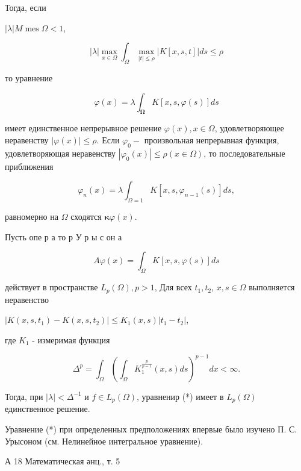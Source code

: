 \documentclass[10pt]{article}
\begin{document}
Тогда, если



$|\lambda| M \operatorname{mes} \Omega<1$,



\[

|\lambda| \max _{x \in \Omega} \int_{\Omega} \max _{|t| \leqslant \rho}|K[x, s, t]| d s \leqslant \rho

\]



то уравнение



\[

\varphi(x)=\lambda \int_{\mathbf{\Omega}} K[x, s, \varphi(s)] d s

\]



имеет единственное непрерывное решение $\varphi(x), x \in \Omega$, удовлетворяющее неравенству $|\varphi(x)| \leqslant \rho$. Если $\varphi_{0}-$ произвольная непрерывная функция, удовлетворяющая неравенству $\left|\varphi_{0}(x)\right| \leqslant \rho(x \in \Omega)$, то последовательные приближения



\[

\varphi_{n}(x)=\lambda \int_{\Omega=1} K\left[x, s, \varphi_{n-1}(s)\right] d s,

\]



равномерно на $\Omega$ сходятся $\mathbf{\kappa} \varphi(x)$.



Пусть опе р а то р У р ы с он а



\[

A \varphi(x)=\int_{\Omega} K[x, s, \varphi(s)] d s

\]



действует в пространстве $L_{p}(\Omega), p>1$, Для всех $t_{1}, t_{2}$, $x, s \in \Omega$ выполняется неравенство



$\left|K\left(x, s, t_{1}\right)-K\left(x, s, t_{2}\right)\right| \leqslant K_{1}(x, s)\left|t_{1}-t_{2}\right|$,



где $K_{1}$ - измеримая функция



\[

\Delta^{p}=\int_{\Omega}\left(\int_{\Omega} K_{1}^{\frac{p}{p-1}}(x, s) d s\right)^{p-1} d x<\infty .

\]



Тогда, при $|\lambda|<\Delta^{-1}$ и $f \in L_{p}(\Omega)$, уравненир (*) имеет в $L_{p}(\Omega)$ единственное решение.



Уравнение (*) при определенных предположениях впервые было изучено П. С. Урысоном (см. Нелинейное интегральное уравнение).



А 18 Математическая әнц., т. 5
\end{document}
